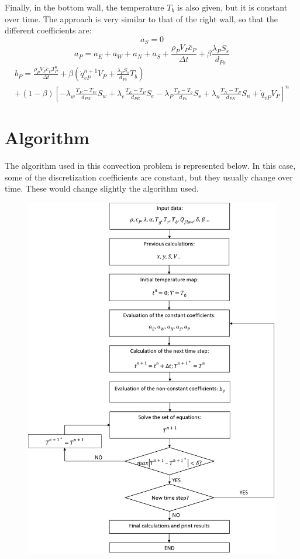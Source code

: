 Finally, in the bottom wall, the temperature $T_{b}$ is also given, but it is constant over time. The approach is very similar to that of the right wall, so that the different coefficients are:
\begin{equation}
a_{S}=0
\end{equation}
\begin{equation}
a_P=a_{E}+a_{W}+a_{N}+a_{S}+\frac{\rho_{P}V_{P}\bar{c}_{P}}{\Delta t}+\beta\frac{\lambda_{P}S_{s}}{d_{Ps}}
\end{equation}
\begin{multline}
b_{P}=\frac{\rho_{P}V_{P}\bar{c}_{P}T_{P}^{n}}{\Delta t}+\beta\left(\dot{q}_{vP}^{n+1}V_{P}+\frac{\lambda_{P}S_{s}}{d_{Ps}}T_{b}\right) \\
+\left(1-\beta\right)\left[-\lambda_{w}\frac{T_{P}-T_{W}}{d_{PW}}S_{w}+\lambda_{e}\frac{T_{E}-T_{P}}{d_{PE}}S_{e}-\lambda_{P}\frac{T_{P}-T_{b}}{d_{Ps}}S_{s}+\lambda_{n}\frac{T_{N}-T_{P}}{d_{PN}}S_{n}+\dot{q}_{vP}V_{P}\right]^{n}
\end{multline}

\section{Algorithm}
The algorithm used in this convection problem is represented below. In this case, some of the discretization coefficients are constant, but they usually change over time. These would change slightly the algorithm used.
\begin{figure}[h!]
	\centering
	\includegraphics[scale=0.154]{FourMaterials/algorithm}
\end{figure}

